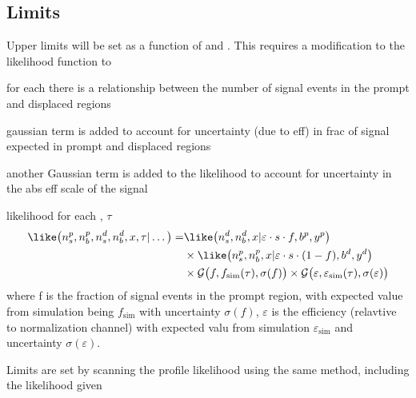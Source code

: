 \subsection{Limits}
Upper limits will be set as a function of \mass{\db} and \lifetime{\db}.
This requires a modification to the likelihood function to

for each \lifetime there is a relationship between the number of signal events in the prompt and
displaced regions

gaussian term is added to account for uncertainty (due to eff) in frac of signal expected in prompt
and displaced regions

another Gaussian term is added to the likelihood to account for uncertainty in the abs eff scale of
the signal

likelihood for each , $\tau$
\begin{align}
  \like\big(n_s^p, n_b^p, n_s^d, n_b^d, x, \tau | \dots\big) =
   &\like\big(n_s^d, n_b^d, x | \varepsilon\cdot s\cdot f,b^p,y^p\big) \\\nonumber
   &\times\like\big(n_s^p, n_b^p, x | \varepsilon\cdot s\cdot(1-f),b^d,y^d\big)\\\nonumber
   &\times\mathcal{G}\big(f, f_\mathrm{sim}(\tau),\sigma(f)\big)
   \times\mathcal{G}\big(\varepsilon, \varepsilon_\mathrm{sim}(\tau),\sigma(\varepsilon)\big)
\end{align}
where f is the fraction of signal events in the prompt region, with expected value from simulation
being $f_\mathrm{sim}$ with uncertainty $\sigma(f)$, $\varepsilon$ is the efficiency (relavtive to
normalization channel) with expected valu from simulation $\varepsilon_\mathrm{sim}$ and
uncertainty $\sigma(\varepsilon)$.

Limits are set by scanning the profile likelihood using the same method, including the likelihood
given



















